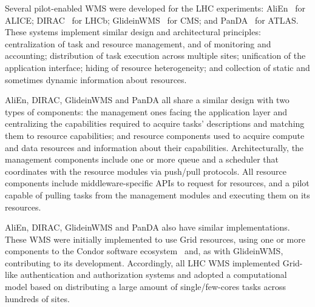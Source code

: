 

Several pilot-enabled WMS were developed for the LHC experiments:
AliEn~\cite{Bagnasco2010} for ALICE; DIRAC~\cite{Paterson2010} for LHCb;
GlideinWMS~\cite{sfiligoi2008glideinwms} for CMS; and
PanDA~\cite{maeno2014evolution} for ATLAS. These systems implement similar
design and architectural principles: centralization of task and resource
management, and of monitoring and accounting; distribution of task execution
across multiple sites; unification of the application interface; hiding of
resource heterogeneity; and collection of static and sometimes dynamic
information about resources.

AliEn, DIRAC, GlideinWMS and PanDA all share a similar design with two types of
components: the management ones facing the application layer and centralizing
the capabilities required to acquire tasks' descriptions and matching them to
resource capabilities; and resource components used to acquire compute and data
resources and information about their capabilities. Architecturally, the
management components include one or more queue and a scheduler that coordinates
with the resource modules via push/pull protocols. All resource components
include middleware-specific APIs to request for resources, and a pilot capable
of pulling tasks from the management modules and executing them on its
resources.

AliEn, DIRAC, GlideinWMS and PanDA also have similar implementations. These WMS
were initially implemented to use Grid resources, using one or more components
to the Condor software ecosystem~\cite{thain2005distributed} and, as with
GlideinWMS, contributing to its development. Accordingly, all LHC WMS
implemented Grid-like authentication and authorization systems and adopted a
computational model based on distributing a large amount of single/few-cores
tasks across hundreds of sites.

